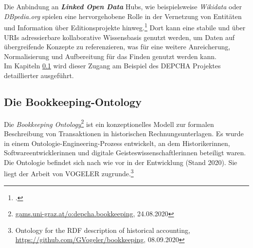 \documentclass[12pt,a4paper]{article}
\begin{document}
{\\
\\
Die Anbindung an \textbf{\textit{Linked Open Data}} Hubs, wie beispielsweise \textit{Wikidata} oder \textit{DBpedia.org} spielen eine hervorgehobene Rolle in der Vernetzung von Entitäten und Information über Editionsprojekte hinweg.\footcite{wettlaufer2018semanticwebEdition} Dort kann eine stabile und über URIs adressierbare kollaborative Wissensbasis genutzt werden, um Daten auf übergreifende Konzepte zu referenzieren, was für eine weitere Anreicherung, Normalisierung und Aufbereitung für das Finden genutzt werden kann. 
\\
Im Kapiteln \ref{BK} wird dieser Zugang am Beispiel des DEPCHA Projektes detaillierter ausgeführt.
}

\newpage
\subsection{Die Bookkeeping-Ontology}
\label{BK}

Die \textit{Bookkeeping Ontology}\footnote{\url{gams.uni-graz.at/o:depcha.bookkeeping}, 24.08.2020} ist ein konzeptionelles Modell zur formalen Beschreibung von Transaktionen in historischen Rechnungsunterlagen. Es wurde in einem Ontologie-Engineering-Prozess entwickelt, an dem Historikerinnen, Softwareentwicklerinnen und digitale Geisteswissenschaftlerinnen beteiligt waren. Die Ontologie befindet sich nach wie vor in der Entwicklung (Stand 2020). Sie liegt der Arbeit von VOGELER zugrunde.\footnote{Ontology for the RDF description of historical accounting, \url{https://github.com/GVogeler/bookkeeping}, 08.09.2020} 
\end{document}
